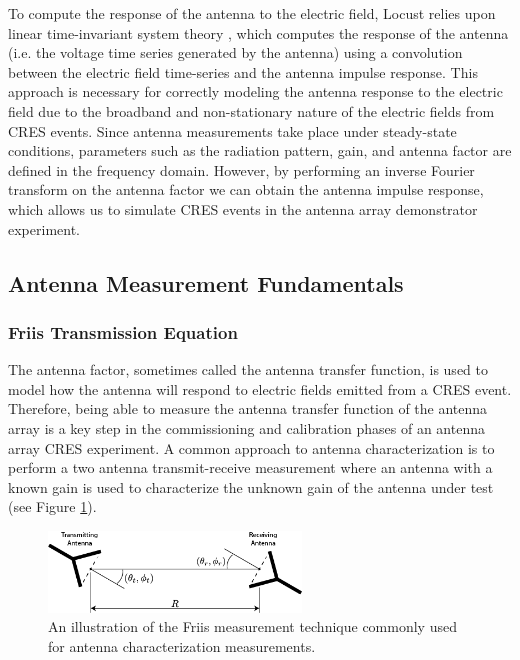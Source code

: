To compute the response of the antenna to the electric field, Locust relies upon linear time-invariant system theory \cite{lti_theory_wiki}, which computes the response of the antenna (i.e. the voltage time series generated by the antenna) using a convolution between the electric field time-series and the antenna impulse response. This approach is necessary for correctly modeling the antenna response to the electric field due to the broadband and non-stationary nature of the electric fields from CRES events. Since antenna measurements take place under steady-state conditions, parameters such as the radiation pattern, gain, and antenna factor are defined in the frequency domain. However, by performing an inverse Fourier transform on the antenna factor we can obtain the antenna impulse response, which allows us to simulate CRES events in the antenna array demonstrator experiment. 

\subsection{Antenna Measurement Fundamentals}
\subsubsection{Friis Transmission Equation}

The antenna factor, sometimes called the antenna transfer function, is used to model how the antenna will respond to electric fields emitted from a CRES event. Therefore, being able to measure the antenna transfer function of the antenna array is a key step in the commissioning and calibration phases of an antenna array CRES experiment. A common approach to antenna characterization is to perform a two antenna transmit-receive measurement where an antenna with a known gain is used to characterize the unknown gain of the antenna under test (see Figure \ref{fig:friis-meas}). 
\begin{figure}[htbp]
    \centering
    \includegraphics[width=0.6\textwidth]{figs/Chapter-5/230409_friis_figure.png}
    \caption{An illustration of the Friis measurement technique commonly used for antenna characterization measurements.}
    \label{fig:friis-meas}
\end{figure}


